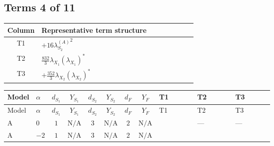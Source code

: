 \documentclass[8pt]{article}
\begin{document}
\begin{landscape}
\subsection*{Terms 4 of 11}
\begin{center}
\begin{tabular}{@{}c >{\raggedright\arraybackslash}p{0.82\linewidth}@{}}
\toprule
Column & Representative term structure \\
\midrule
T1 & \(\displaystyle +16 {\lambda_{S_2}^{(A)}}^2\) \\
\midrule
T2 & \(\displaystyle \frac{832}{3} {\lambda_{X_{1}}} \left({\lambda_{X_{1}}}\right)^{*}\) \\
\midrule
T3 & \(\displaystyle +\frac{352}{3} {\lambda_{X_{2}}} \left({\lambda_{X_{2}}}\right)^{*}\) \\
\midrule
\bottomrule
\end{tabular}
\end{center}
\smallskip
\tiny
\begin{longtable}{@{}llcccccc >{\raggedright\arraybackslash}p{0.21\linewidth} >{\raggedright\arraybackslash}p{0.21\linewidth} >{\raggedright\arraybackslash}p{0.21\linewidth}@{}}
\toprule
Model & $\alpha$ & $d_{S_1}$ & $Y_{S_1}$ & $d_{S_2}$ & $Y_{S_2}$ & $d_F$ & $Y_F$ & T1 & T2 & T3 \\
\midrule
\endfirsthead
\toprule
Model & $\alpha$ & $d_{S_1}$ & $Y_{S_1}$ & $d_{S_2}$ & $Y_{S_2}$ & $d_F$ & $Y_F$ & T1 & T2 & T3 \\
\midrule
\endhead
A & $0$ & $1$ & $\text{N/A}$ & $3$ & $\text{N/A}$ & $2$ & $\text{N/A}$ & \scriptsize\adjustbox{max width=\linewidth}{$\begin{gathered} +16 {\lambda_{S_2}^{(A)}}^2\end{gathered}$} & --- & --- \\
\midrule
A & $-2$ & $1$ & $\text{N/A}$ & $3$ & $\text{N/A}$ & $2$ & $\text{N/A}$ & \scriptsize\adjustbox{max width=\linewidth}{$\begin{gathered} +16 {\lambda_{S_2}^{(A)}}^2\end{gathered}$} & \scriptsize\adjustbox{max width=\linewidth}{$\begin{gathered} \frac{832}{3} {\lambda_{X_{1}}} \left({\lambda_{X_{1}}}\right)^{*}\end{gathered}$} & \scriptsize\adjustbox{max width=\linewidth}{$\begin{gathered} +\frac{352}{3} {\lambda_{X_{2}}} \left({\lambda_{X_{2}}}\right)^{*}\end{gathered}$} \\

\end{longtable}
\end{landscape}
\end{document}
